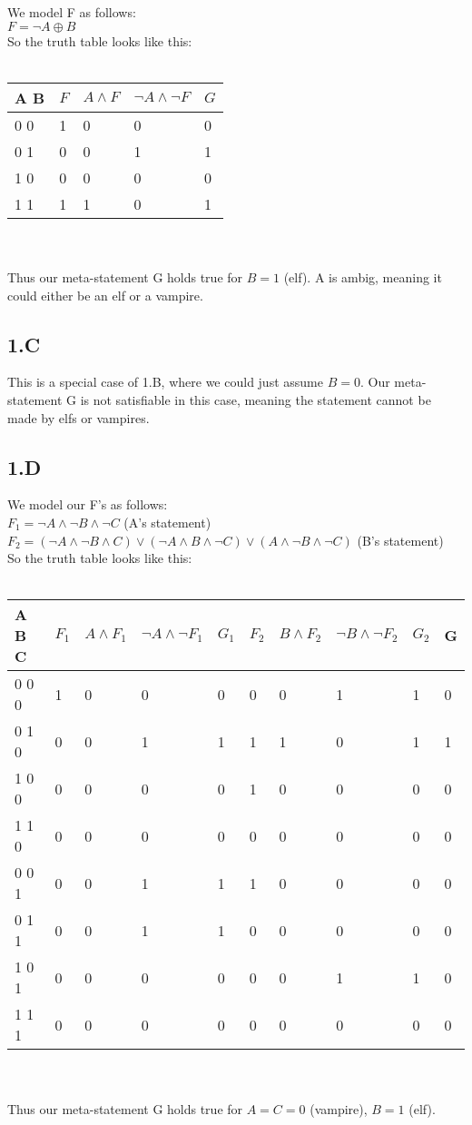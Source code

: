 \documentclass[12pt]{article}
\begin{document}
We model F as follows:\\
$F = \neg A \oplus B$ \\
So the truth table looks like this:\\\\
\begin{tabular}{  l | l | l | l | l}
	A B & $F$ & $A \land F $ & $\neg A \land \neg F$ & $G$ \\ \hline
	0 0 & 1 & 0 & 0 & 0 \\
	0 1 & 0 & 0 & 1 & 1 \\
	1 0 & 0 & 0 & 0 & 0 \\
	1 1 & 1 & 1 & 0 & 1 \\
\end{tabular} \\\\
Thus our meta-statement G holds true for $B=1$ (elf). A is ambig, meaning it could either be an elf or a vampire.

\subsection*{1.C}

This is a special case of 1.B, where we could just assume $B=0$. Our meta-statement G is not satisfiable in this case, meaning the statement cannot be made by elfs or vampires.

\subsection*{1.D}
We model our F's as follows:\\
$F_1 = \neg A \land \neg B \land \neg C$ (A's statement)\\	
$F_2 = (\neg A \land \neg B \land C) \lor (\neg A \land B \land \neg C) \lor (A \land \neg B \land \neg C)$ (B's statement)\\
So the truth table looks like this:\\\\
\begin{tabular}{  l | l | l | l | l | l | l | l | l | l}
	A B C & $F_1$ & $A \land F_1 $ & $\neg A \land \neg F_1$ & $G_1$ & $F_2$ & $B \land F_2 $ & $\neg B \land \neg F_2$ & $G_2$ & G\\ \hline
	0 0 0 & 1 & 0 & 0 & 0 & 0 & 0 & 1 & 1 & 0 \\
	0 1 0 & 0 & 0 & 1 & 1 & 1 & 1 & 0 & 1 & 1 \\
	1 0 0 & 0 & 0 & 0 & 0 & 1 & 0 & 0 & 0 & 0 \\
	1 1 0 & 0 & 0 & 0 & 0 & 0 & 0 & 0 & 0 & 0 \\
	0 0 1 & 0 & 0 & 1 & 1 & 1 & 0 & 0 & 0 & 0 \\
	0 1 1 & 0 & 0 & 1 & 1 & 0 & 0 & 0 & 0 & 0 \\
	1 0 1 & 0 & 0 & 0 & 0 & 0 & 0 & 1 & 1 & 0 \\
	1 1 1 & 0 & 0 & 0 & 0 & 0 & 0 & 0 & 0 & 0 \\
\end{tabular} \\\\
Thus our meta-statement G holds true for $A=C=0$ (vampire), $B=1$ (elf).
\end{document}
